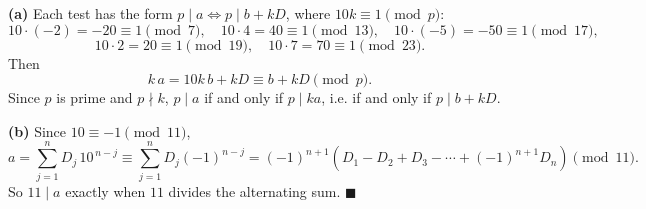 \textbf{(a)} Each test has the form $p\mid a\iff p\mid b+kD$, where $10k\equiv1\pmod p$:
\[10\cdot(-2)=-20\equiv1\pmod7,\quad10\cdot4=40\equiv1\pmod{13},\quad10\cdot(-5)=-50\equiv1\pmod{17},\]
\[10\cdot2=20\equiv1\pmod{19},\quad10\cdot7=70\equiv1\pmod{23}.\]
Then
\[k\,a=10k\,b+kD\equiv b+kD\pmod p.\]
Since $p$ is prime and $p\nmid k$, $p\mid a$ if and only if $p\mid ka$, i.e. if and only if $p\mid b+kD$.

\textbf{(b)} Since $10\equiv-1\pmod{11}$,
\[a=\sum_{j=1}^{n}D_j\,10^{\,n-j}\equiv\sum_{j=1}^{n}D_j(-1)^{n-j}=(-1)^{n+1}\left(D_1-D_2+D_3-\cdots+(-1)^{n+1}D_n\right)\pmod{11}.\]
So $11\mid a$ exactly when $11$ divides the alternating sum. $\blacksquare$
